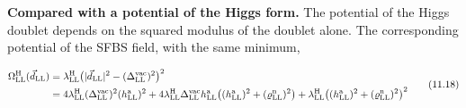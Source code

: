 \documentclass[
  10pt,
]{article}
\begin{document}
\textbf{Compared with a potential of the Higgs form.} The potential of
the Higgs doublet depends on the squared modulus of the doublet alone.
The corresponding potential of the SFBS field, with the same minimum,

\[\begin{aligned}\Omega^{\rm H}_{\rm LL}(\vec d_{\rm LL})&=\lambda^{\rm H}_{\rm LL}\big(\lvert\vec d_{\rm LL}\rvert^2-(\Delta^{\rm vac}_{\rm LL})^2\big)^2\\&=4\lambda^{\rm H}_{\rm LL}(\Delta^{\rm vac}_{\rm LL})^2(h^{\rm a}_{\rm LL})^2+4\lambda^{\rm H}_{\rm LL}\Delta^{\rm vac}_{\rm LL}h^{\rm a}_{\rm LL}\big((h^{\rm a}_{\rm LL})^2+(\varrho^{\rm n}_{\rm LL})^2\big)+\lambda^{\rm H}_{\rm LL}\big((h^{\rm a}_{\rm LL})^2+(\varrho^{\rm n}_{\rm LL})^2\big)^2\end{aligned}\tag{11.18}\]
\end{document}
